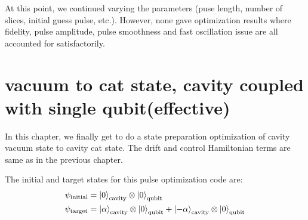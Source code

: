\documentclass[12pt]{report}
\begin{document}
At this point, we continued varying the parameters (puse length, number of slices, initial guess pulse, etc.). 
However, none gave optimization results where fidelity, pulse amplitude, pulse smoothness and fast oscillation issue 
are all accounted for satisfactorily. 

\section{vacuum to cat state, cavity coupled with single qubit(effective)}\label{sec:vac2cat}
In this chapter, we finally get to do a state preparation optimization of cavity vacuum state to cavity cat state.
The drift and control Hamiltonian terms are same as in the previous chapter.

The initial and target states for this pulse optimization code are:
\begin{align}
    \psi_{\text{initial}} &= \ket{0}_{\text{cavity}} \otimes \ket{0}_{\text{qubit}} \\
    \psi_{\text{target}} &= \ket{\alpha}_{\text{cavity}} \otimes \ket{0}_{\text{qubit}} 
                + \ket{-\alpha}_{\text{cavity}} \otimes \ket{0}_{\text{qubit}} \\
\end{align}
\end{document}
